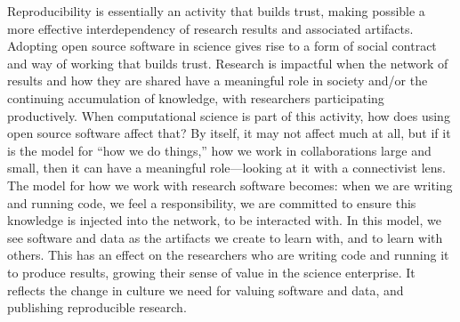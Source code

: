 \documentclass{statement}
\begin{document}
Reproducibility is essentially an activity that builds trust, making possible a more effective interdependency of research results and associated artifacts. 
Adopting open source software in science gives rise to a form of social contract and way of working that builds trust. 
Research is impactful when the network of results and how they are shared have a meaningful role in society and/or the continuing accumulation of knowledge, with researchers participating productively. 
When computational science is part of this activity, how does using open source software affect that? 
By itself, it may not affect much at all, but if it is the model for ``how we do things,'' how we work in collaborations large and small, then it can have a meaningful role---looking at it with a connectivist lens. 
The model for how we work with research software becomes: when we are writing and running code, we feel a responsibility, we are committed to ensure this knowledge is injected into the network, to be interacted with. 
In this model, we see software and data as the artifacts we create to learn with, and to learn with others. 
This has an effect on the researchers who are writing code and running it to produce results, growing their sense of value in the science enterprise. 
It reflects the change in culture we need for valuing software and data, and publishing reproducible research.



{\small


}



\end{document}
